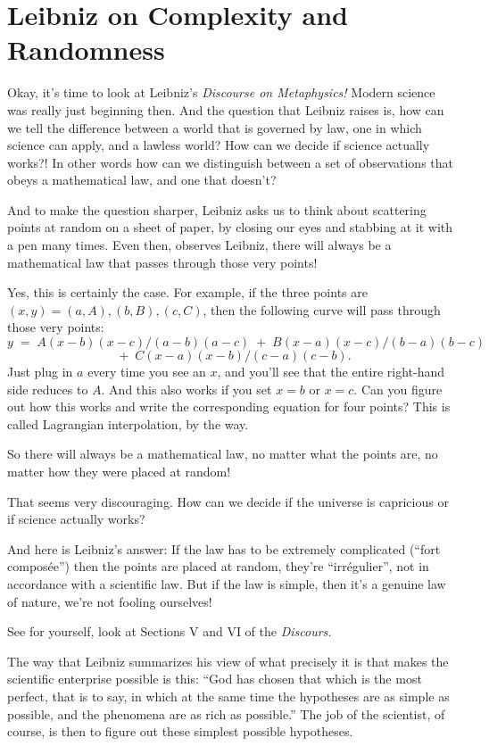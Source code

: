 \documentclass[12pt]{book}
\begin{document}
\section*{Leibniz on Complexity and Randomness}

Okay, it's time to look at Leibniz's \emph{Discourse on Metaphysics!} Modern science was really just
beginning then.  And the question that Leibniz raises is, how can we tell the difference
between a world that is governed by law, one in which science can apply, and a lawless world?
How can we decide if science actually works?!
In other words how can we distinguish between a set of observations that obeys a mathematical
law, and one that doesn't?
 
And to make the question sharper, Leibniz asks us to think about scattering points at random
on a sheet of paper, by closing our eyes and stabbing at it with a pen many times.
Even then, observes Leibniz, there will always be a mathematical law that passes through
those very points!
 
Yes, this is certainly the case. For example, if the three points are $(x,y) = (a,A), (b,B), (c,C)$,
then the following curve will pass through those very points:
\[
         y \; = \; A(x-b)(x-c)/(a-b)(a-c)
           \; + \; B(x-a)(x-c)/(b-a)(b-c)
\]
\[
           \; + \; C(x-a)(x-b)/(c-a)(c-b).
\] 
Just plug in $a$ every time you see an $x$, 
and you'll see that the entire right-hand side reduces to $A$.  
And this also works if you set $x = b$ or $x = c$.
Can you figure out how this works and write the corresponding equation for four points? This is
called Lagrangian interpolation, by the way.
 
So there will always be a mathematical law, no matter what the points are, no matter how they
were placed at random!
 
That seems very discouraging. How can we decide if the universe is capricious or if science
actually works?
 
And here is Leibniz's answer: If the law has to be extremely complicated 
(``fort compos\'ee'') then the points are placed
at random, 
they're ``irr\'egulier'',
not in accordance with a scientific law.  But if the law is simple, then it's a genuine
law of nature, we're not fooling ourselves!
 
See for yourself, look at Sections V and VI of the \emph{Discours.}
 
The way that Leibniz summarizes his view of what precisely it is that makes the
scientific enterprise possible is this: 
``God has chosen that which is the most perfect,
that is to say, in which at the same time the hypotheses are as simple as possible, and
the phenomena are as rich as possible.''
The job of the scientist, of course, is then to figure out these simplest possible hypotheses.
 
\end{document}
